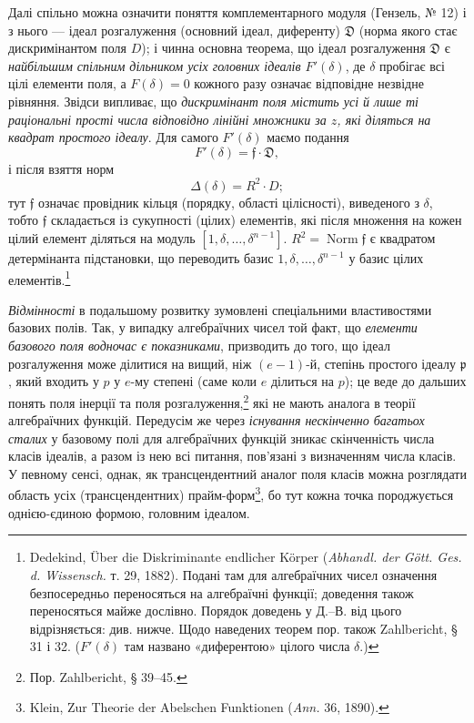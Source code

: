 \documentclass[11pt]{article}
\providecommand{\frD}{\mathfrak D}
\providecommand{\frf}{\mathfrak f}
\providecommand{\frp}{\mathfrak p}
\begin{document}
Далі спільно можна означити поняття комплементарного модуля (Гензель, № 12) і з нього --- ідеал розгалуження (основний ідеал, диференту) \(\frD\) (норма якого стає дискримінантом поля \(D\)); і чинна основна теорема, що ідеал розгалуження \(\frD\) є \emph{найбільшим спільним дільником усіх головних ідеалів \(F'(\delta)\)}, де \(\delta\) пробігає всі цілі елементи поля, а \(F(\delta)=0\) кожного разу означає відповідне незвідне рівняння. Звідси випливає, що \emph{дискримінант поля містить усі й лише ті раціональні прості числа відповідно лінійні множники за \(z\), які діляться на квадрат простого ідеалу}. Для самого \(F'(\delta)\) маємо подання
\[
F'(\delta)=\frf\cdot\frD,
\]
і після взяття норм
\[
\Delta(\delta)=R^2\cdot D;
\]
тут \(\frf\) означає провідник кільця (порядку, області цілісності), виведеного з \(\delta\), тобто \(\frf\) складається із сукупності (цілих) елементів, які після множення на кожен цілий елемент діляться на модуль \([1,\delta,\ldots,\delta^{n-1}]\). \(R^2=\operatorname{Norm}\frf\) є квадратом детермінанта підстановки, що переводить базис \(1,\delta,\ldots,\delta^{n-1}\) у базис цілих елементів.\footnote{Dedekind, Über die Diskriminante endlicher Körper (\emph{Abhandl. der Gött. Ges. d. Wissensch.} т. 29, 1882). Подані там для алгебраїчних чисел означення безпосередньо переносяться на алгебраїчні функції; доведення також переносяться майже дослівно. Порядок доведень у Д.--В. від цього відрізняється: див. нижче. Щодо наведених теорем пор. також Zahlbericht, § 31 і 32. (\(F'(\delta)\) там названо «диферентою» цілого числа \(\delta\).)}

\emph{Відмінності} в подальшому розвитку зумовлені спеціальними властивостями базових полів. Так, у випадку алгебраїчних чисел той факт, що \emph{елементи базового поля водночас є показниками}, призводить до того, що ідеал розгалуження може ділитися на вищий, ніж \((e-1)\)-й, степінь простого ідеалу \(\frp\), який входить у \(p\) у \(e\)-му степені (саме коли \(e\) ділиться на \(p\)); це веде до дальших понять поля інерції та поля розгалуження,\footnote{Пор. Zahlbericht, § 39--45.} які не мають аналога в теорії алгебраїчних функцій. Передусім же через \emph{існування нескінченно багатьох сталих} у базовому полі для алгебраїчних функцій зникає скінченність числа класів ідеалів, а разом із нею всі питання, пов'язані з визначенням числа класів. У певному сенсі, однак, як трансцендентний аналог поля класів можна розглядати область усіх (трансцендентних) прайм-форм\footnote{Klein, Zur Theorie der Abelschen Funktionen (\emph{Ann.} 36, 1890).}, бо тут кожна точка породжується однією-єдиною формою, головним ідеалом.
\end{document}

